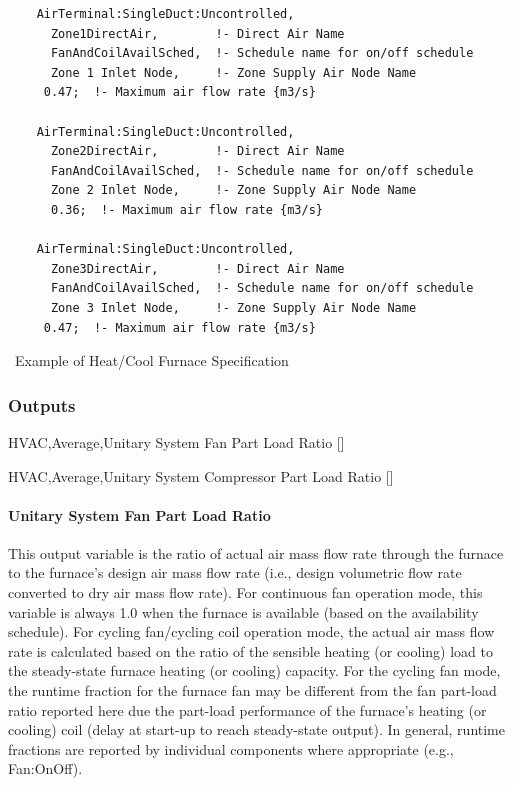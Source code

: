 \begin{lstlisting}
    AirTerminal:SingleDuct:Uncontrolled,
      Zone1DirectAir,        !- Direct Air Name
      FanAndCoilAvailSched,  !- Schedule name for on/off schedule
      Zone 1 Inlet Node,     !- Zone Supply Air Node Name
     0.47;  !- Maximum air flow rate {m3/s}

    AirTerminal:SingleDuct:Uncontrolled,
      Zone2DirectAir,        !- Direct Air Name
      FanAndCoilAvailSched,  !- Schedule name for on/off schedule
      Zone 2 Inlet Node,     !- Zone Supply Air Node Name
      0.36;  !- Maximum air flow rate {m3/s}

    AirTerminal:SingleDuct:Uncontrolled,
      Zone3DirectAir,        !- Direct Air Name
      FanAndCoilAvailSched,  !- Schedule name for on/off schedule
      Zone 3 Inlet Node,     !- Zone Supply Air Node Name
     0.47;  !- Maximum air flow rate {m3/s}
\end{lstlisting}

~Example of Heat/Cool Furnace Specification

\subsubsection{Outputs}\label{outputs-1-029}

HVAC,Average,Unitary System Fan Part Load Ratio {[]}

HVAC,Average,Unitary System Compressor Part Load Ratio {[]}

\paragraph{Unitary System Fan Part Load Ratio}\label{unitary-system-fan-part-load-ratio-1}

This output variable is the ratio of actual air mass flow rate through the furnace to the furnace's design air mass flow rate (i.e., design volumetric flow rate converted to dry air mass flow rate). For continuous fan operation mode, this variable is always 1.0 when the furnace is available (based on the availability schedule). For cycling fan/cycling coil operation mode, the actual air mass flow rate is calculated based on the ratio of the sensible heating (or cooling) load to the steady-state furnace heating (or cooling) capacity. For the cycling fan mode, the runtime fraction for the furnace fan may be different from the fan part-load ratio reported here due the part-load performance of the furnace's heating (or cooling) coil (delay at start-up to reach steady-state output). In general, runtime fractions are reported by individual components where appropriate (e.g., Fan:OnOff).


